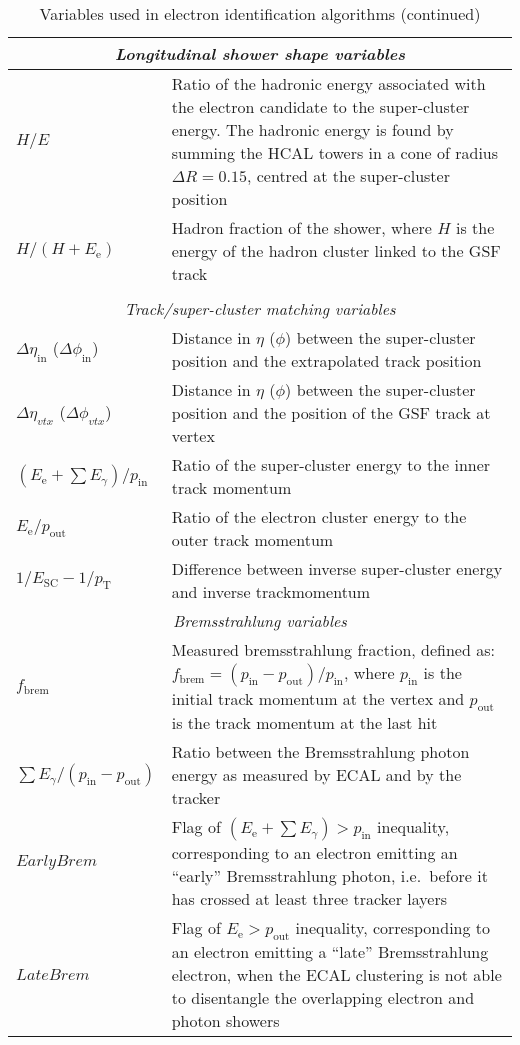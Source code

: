 \begin{longtable}{| p{} | p{} |}
  \multicolumn{2}{|c|}{\textit{Longitudinal shower shape variables}} \\
  \midrule
  $H/E$ & Ratio of the hadronic energy associated with the electron candidate to the super-cluster energy. The hadronic energy is found by summing the HCAL towers in a cone of radius $\Delta R = 0.15$, centred at the super-cluster position\\
  \midrule
  $H/(H+E_\text{e})$ & Hadron fraction of the shower, where $H$ is the energy of the hadron cluster linked to
  the GSF track\\
  \midrule

  \caption*{Variables used in electron identification algorithms (continued)} \\
  \midrule


  \multicolumn{2}{|c|}{\textit{Track/super-cluster matching variables}} \\
  \midrule
  $\Delta\eta_{\text{in}}$ ($\Delta\phi_{\text{in}}$) & Distance in $\eta$ ($\phi$) between the super-cluster
  position and the extrapolated track position \\
  \midrule
  $\Delta\eta_{vtx}$ ($\Delta\phi_{vtx}$) & Distance in $\eta$ ($\phi$) between the super-cluster
  position and the position of the GSF track at vertex \\
  \midrule
  $(E_\text{e}+\sum E_\gamma)/p_\text{in}$ & Ratio of the super-cluster energy to the inner track
  momentum\\
  \midrule
  $E_\text{e}/p_\text{out}$ & Ratio of the electron cluster energy to the outer track momentum\\
  \midrule
  $1/E_\text{SC} - 1/p_\text{T}$ & Difference between inverse super-cluster energy and inverse
  track\newline momentum\\
  \midrule

  \multicolumn{2}{|c|}{\textit{Bremsstrahlung variables}} \\
  \midrule
  $f_\text{brem}$ & Measured bremsstrahlung fraction, defined as:
  $f_\text{brem} = (p_\text{in}-p_\text{out})/p_\text{in}$, where $p_\text{in}$ is the initial track momentum at the vertex and $p_\text{out}$ is the track momentum at the last hit\\
  \midrule
  $\sum E_\gamma/(p_\text{in}-p_\text{out})$ & Ratio between the Bremsstrahlung photon energy as measured by
  ECAL and by the tracker\\
  \midrule
  $EarlyBrem$ & Flag of $(E_\text{e}+\sum E_\gamma)>p_\text{in}$ inequality, corresponding to an electron
  emitting an ``early'' Bremsstrahlung photon, i.e.\ before it has crossed at least three tracker layers\\
  \midrule
  $LateBrem$ & Flag of $E_\text{e}>p_\text{out}$ inequality, corresponding to an electron emitting a ``late''
  Bremsstrahlung electron, when the ECAL clustering is not able to disentangle the overlapping electron and photon
  showers\\

  \bottomrule
\end{longtable}
